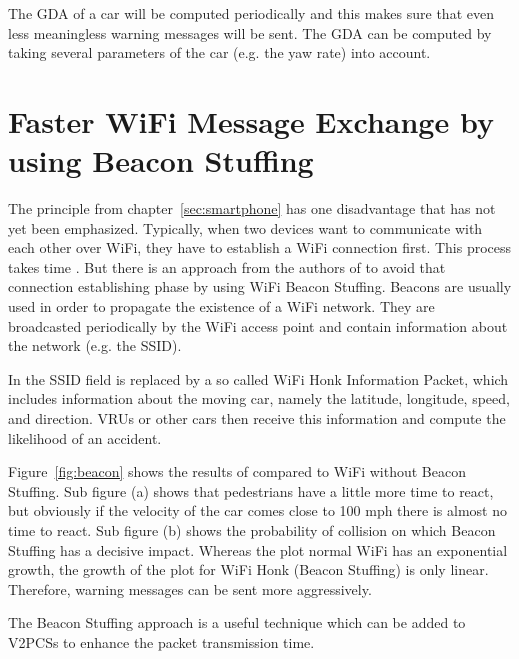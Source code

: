 \documentclass[]{ccs-thesis}
\begin{document}
The \ac{GDA} of a car will be computed periodically and this makes sure that even less meaningless warning messages will be sent. The \ac{GDA} can be computed by taking several parameters of the car (e.g. the yaw rate) into account.


\section{Faster WiFi Message Exchange by using Beacon Stuffing}\label{sec:beacon}

The principle from chapter~\ref{sec:smartphone} has one disadvantage that has not yet been emphasized.
Typically, when two devices want to communicate with each other over WiFi, they have to establish a WiFi connection first. This process takes time . But there is an approach from the authors of \cite{beacon} to avoid that connection establishing phase by using WiFi Beacon Stuffing. Beacons are usually used in order to propagate the existence of a WiFi network. They are broadcasted periodically by the WiFi access point and contain information about the network (e.g. the SSID).

In \cite{beacon} the SSID field is replaced by a so called WiFi Honk Information Packet, which includes information about the moving car, namely the latitude, longitude, speed, and direction. \acp{VRU} or other cars then receive this information and compute the likelihood of an accident.

Figure~\ref{fig:beacon} shows the results of \cite{beacon} compared to WiFi without Beacon Stuffing. Sub figure (a) shows that pedestrians have a little more time to react, but obviously if the velocity of the car comes close to 100 mph there is almost no time to react. Sub figure (b) shows the probability of collision on which Beacon Stuffing has a decisive impact. Whereas the plot normal WiFi has an exponential growth, the growth of the plot for WiFi Honk (Beacon Stuffing) is only linear. Therefore, warning messages can be sent more aggressively. 

The Beacon Stuffing approach is a useful technique which can be added to \acp{V2PCS} to enhance the packet transmission time.
\end{document}
